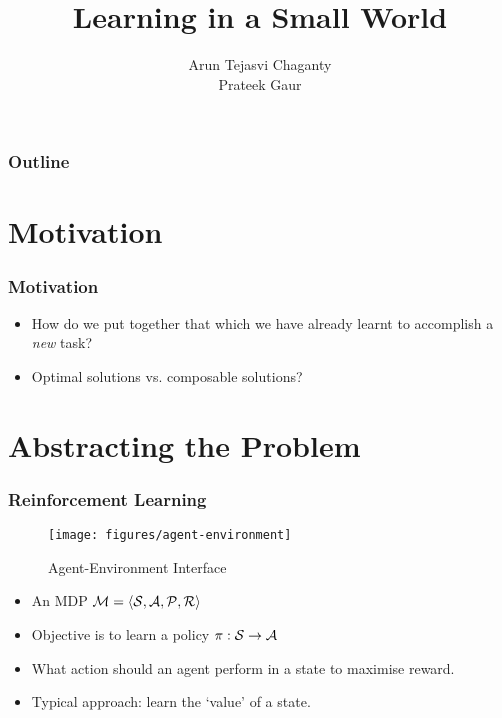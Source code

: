 \documentclass{beamer}
\title{Learning in a Small World}
\author{Arun Tejasvi Chaganty\\ Prateek Gaur}
\begin{document}
\begin{frame}
\titlepage
\end{frame}

\begin{frame}
\frametitle{Outline} %
\tableofcontents  %
\end{frame}

\section{Motivation}
\label{sec:motivation}

\begin{frame}
    \frametitle{Motivation}
    \label{frame:motivation}
    
    \begin{itemize}
            \item How do we put together that which we have already learnt to accomplish a {\em new} task?
            \pause 
            \item Optimal solutions vs. composable solutions?
    \end{itemize}

\end{frame}

\section{Abstracting the Problem}
\label{sec:abstraction}

\begin{frame}
    \frametitle{Reinforcement Learning}
    \label{frame:abstraction-rl}

    \begin{figure}[h]
        \centering
        \texttt{[image: figures/agent-environment]}
        \label{fig:agent-environment}
        \caption{Agent-Environment Interface}
    \end{figure}

    \begin{itemize}
            \item An MDP $\mathcal{M} = \langle  \mathcal{S}, \mathcal{A}, \mathcal{P}, \mathcal{R}  \rangle$
            \item Objective is to learn a policy $\pi : \mathcal{S} \to \mathcal{A}$
            \item What action should an agent perform in a state to maximise
                reward.
            \item Typical approach: learn the `value' of a state.
    \end{itemize}
\end{frame}
\end{document}
